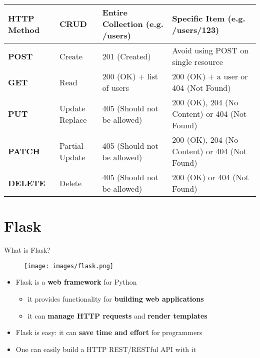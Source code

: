\documentclass{beamer}[10pt, usepdftitle=false handout]
\begin{document}
\begin{frame}


\begin{center}
\begin{tabular}{m{2cm}|m{2cm}|m{3cm}|m{3cm}}
\textbf{HTTP Method} & \textbf{CRUD} & \textbf{Entire Collection (e.g. /users)} & \textbf{Specific Item (e.g. /users/123)} \\ \hline
\textbf{POST} & Create & 201 (Created) & Avoid using POST on single resource \\ \hline
\textbf{GET} & Read & 200 (OK) + list of users & 200 (OK) + a user or 404 (Not Found)  \\ \hline
\textbf{PUT} & Update \newline Replace & 405 (Should not be allowed) & 200 (OK), 204 (No Content) or 404 (Not Found) \\ \hline
\textbf{PATCH} & Partial \newline Update & 405 (Should not be allowed) & 200 (OK), 204 (No Content) or 404 (Not Found) \\ \hline 
\textbf{DELETE} & Delete & 405 (Should not be allowed) & 200 (OK) or 404 (Not Found) \\ \hline
\end{tabular}
\end{center}

\end{frame}

\section{Flask}

\begin{frame}

What is Flask?
\vspace*{0.6em}

	\begin{figure}
	\texttt{[image: images/flask.png]} 
	\end{figure}

\begin{itemize}
\item{Flask is a \textbf{web framework} for Python
	\begin{itemize}
		\item{it provides functionality for \textbf{building web applications}}
		\item{it can \textbf{manage HTTP requests} and \textbf{render templates}}
	\end{itemize} }
\item{Flask is easy: it can \textbf{save time and effort} for programmers}
\item{One can easily build a HTTP REST/RESTful API with it}
\end{itemize}

\end{frame}
\end{document}
